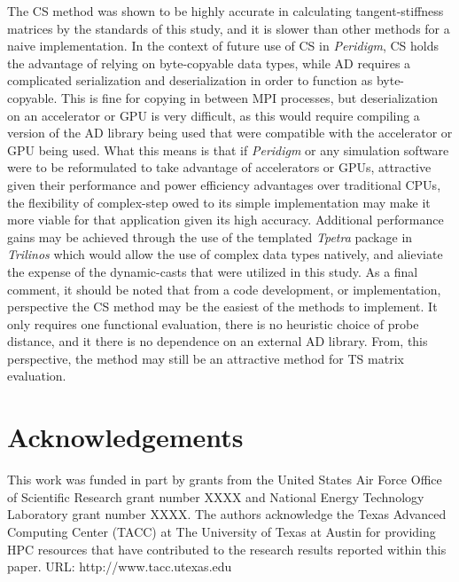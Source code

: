 \documentclass[preprint,12pt]{elsarticle}
\begin{document}
The CS method was shown to be highly accurate in calculating tangent-stiffness matrices by the standards of this study, and it is slower than other methods for a naive implementation. In the context of future use of CS in \emph{Peridigm}, CS holds the advantage of relying on byte-copyable data types, while AD requires a complicated serialization and deserialization in order to function as byte-copyable. This is fine for copying in between MPI processes, but deserialization on an accelerator or GPU is very difficult, as this would require compiling a version of the AD library being used that were compatible with the accelerator or GPU being used. What this means is that if \emph{Peridigm} or any simulation software were to be reformulated to take advantage of accelerators or GPUs, attractive given their performance and power efficiency advantages over traditional CPUs, the flexibility of complex-step owed to its simple implementation may make it more viable for that application given its high accuracy. Additional performance gains may be achieved through the use of the templated \emph{Tpetra} package in \emph{Trilinos} which would allow the use of complex data types natively, and alieviate the expense of the dynamic-casts that were utilized in this study.  As a final comment, it should be noted that from a code development, or implementation, perspective the CS method may be the easiest of the methods to implement. It only requires one functional evaluation, there is no heuristic choice of probe distance, and it there is no dependence on an external AD library.  From, this perspective, the method may still be an attractive method for TS matrix evaluation.




\section{Acknowledgements}
\label{sec:ack}
This work was funded in part by grants from the United States Air Force Office of Scientific Research grant number XXXX  and National Energy Technology Laboratory grant number XXXX. The authors acknowledge the Texas Advanced Computing Center (TACC) at The University of Texas at Austin for providing HPC resources that have contributed to the research results reported within this paper. URL: http://www.tacc.utexas.edu
\end{document}
